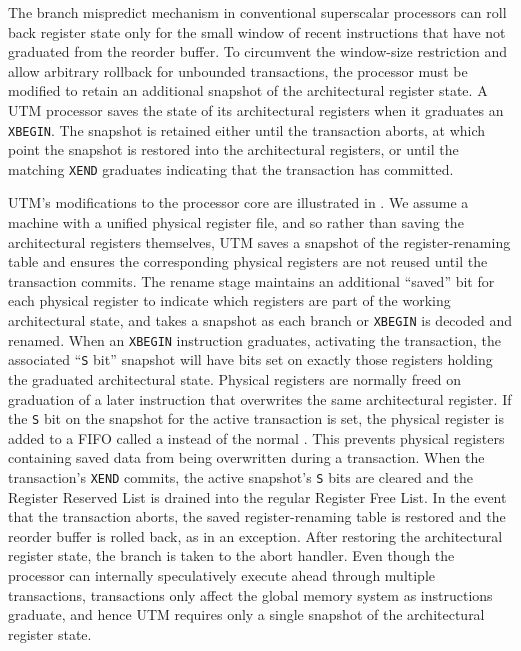 The branch mispredict mechanism in conventional superscalar processors
can roll back register state only for the small window of recent
instructions that have not graduated from the reorder buffer.  To
circumvent the window-size restriction and allow arbitrary rollback
for unbounded transactions, the processor must be modified to retain
an additional snapshot of the architectural register state.  A UTM
processor saves the state of its architectural registers when it
graduates an \texttt{XBEGIN}\@.  The snapshot is retained either until
the transaction aborts, at which point the snapshot is restored into
the architectural registers, or until the matching \texttt{XEND}
graduates indicating that the transaction has committed.

UTM's modifications to the processor core are illustrated in
.  We assume a machine with a unified physical
register file, and so rather than saving the architectural registers
themselves, UTM saves a snapshot of the register-renaming table
and ensures the corresponding physical registers are not reused until
the transaction commits.
The rename stage maintains an additional ``saved'' bit
for each physical register 
to indicate which registers are part of the working
architectural state, and takes a snapshot as
each branch or \texttt{XBEGIN} is decoded and renamed.
When an \texttt{XBEGIN} instruction
graduates, activating the transaction, the associated ``\texttt{S} bit''
snapshot will have bits set
on exactly those registers holding the graduated architectural state.  Physical
registers are normally freed on graduation of a later instruction that
overwrites the same architectural register.  If the \texttt{S} bit on
the snapshot for the active transaction is
set, the physical register is added to a FIFO called a  instead of the normal .  This
prevents physical registers containing saved data from being
overwritten during a transaction.  When the
transaction's \texttt{XEND} commits, the active snapshot's \texttt{S}
bits are cleared and the Register
Reserved List is drained into the regular Register Free List.  In the
event that the transaction aborts, the saved register-renaming table
is restored and the reorder buffer is rolled back, as in an exception.
After restoring the architectural register state, the branch is taken
to the abort handler.  Even though the processor can internally
speculatively execute ahead through multiple transactions,
transactions only affect the global memory system as instructions
graduate, and hence UTM requires only a single snapshot of the
architectural register state.

